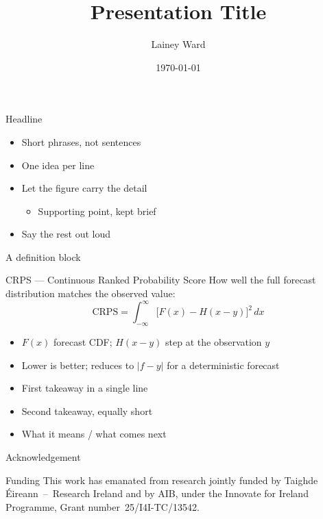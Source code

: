 \documentclass[aspectratio=169,t]{beamer}
\title{Presentation Title}
\author{Lainey Ward}
\date{\today}
\begin{document}
\maketitleframe

\begin{frame}{Headline}
  \begin{itemize}
    \item Short phrases, not sentences
    \item One idea per line
    \item Let the figure carry the detail
    \begin{itemize}
      \item Supporting point, kept brief
    \end{itemize}
    \item Say the rest out loud
  \end{itemize}
\end{frame}

\begin{frame}{A definition block}
  \begin{block}{CRPS --- Continuous Ranked Probability Score}
    How well the full forecast distribution matches the observed value:
    \[
      \mathrm{CRPS} = \int_{-\infty}^{\infty}\bigl[F(x) - H(x-y)\bigr]^2\,dx
    \]
    \begin{itemize}
      \item $F(x)$ forecast CDF; \; $H(x-y)$ step at the observation $y$
      \item Lower is better; reduces to $|f-y|$ for a deterministic forecast
    \end{itemize}
  \end{block}
\end{frame}

\begin{conclusions}[Conclusions]
  \begin{itemize}
    \item First takeaway in a single line
    \item Second takeaway, equally short
    \item What it means / what comes next
  \end{itemize}
\end{conclusions}

\begin{frame}{Acknowledgement}
  \vspace{1.5em}
  \begin{block}{Funding}
    This work has emanated from research jointly funded by Taighde
    Éireann~--~Research Ireland and by AIB, under the Innovate for Ireland
    Programme, Grant number~25/I4I-TC/13542.
  \end{block}
\end{frame}
\end{document}
